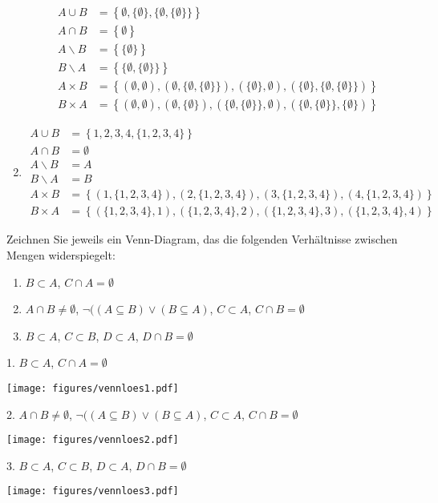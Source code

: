 \documentclass[12pt]{exam}
\begin{document}
\begin{questions}
\begin{solution}
\begin{enumerate}
\begin{align*}
			A\cup B &=\left\{\emptyset,\{\emptyset\},\{\emptyset,\{\emptyset\}\}\right\}\\
			A\cap B &=\left\{\emptyset\right\}\\
			A\backslash B &=\left\{\{\emptyset\}\right\}\\
			B\backslash A &=\left\{\{\emptyset,\{\emptyset\}\}\right\}\\
			A\times B &=\left\{(\emptyset,\emptyset),(\emptyset,\{\emptyset,\{\emptyset\}\}),(\{\emptyset\},\emptyset),(\{\emptyset\},\{\emptyset,\{\emptyset\}\})\right\}\\
			B\times A &=\left\{(\emptyset,\emptyset),(\emptyset,\{\emptyset\}),(\{\emptyset,\{\emptyset\}\},\emptyset),(\{\emptyset,\{\emptyset\}\},\{\emptyset\})\right\}
		\end{align*}
		\item \begin{align*}
			A\cup B &=\left\{1,2,3,4,\{1,2,3,4\}\right\}\\
			A\cap B &=\emptyset\\
			A\backslash B &=A\\
			B\backslash A &=B\\
			A\times B &=\left\{(1,\{1,2,3,4\}),(2,\{1,2,3,4\}),(3,\{1,2,3,4\}),(4,\{1,2,3,4\})\right\}\\
			B\times A &=\left\{(\{1,2,3,4\},1),(\{1,2,3,4\},2),(\{1,2,3,4\},3),(\{1,2,3,4\},4)\right\}
		\end{align*}
	\end{enumerate}
\end{solution}




Zeichnen Sie jeweils ein Venn-Diagram, das die folgenden Verhältnisse zwischen Mengen widerspiegelt:
\begin{enumerate}
	\item $B\subset A$, $C\cap A=\emptyset$
	\item $A\cap B\not=\emptyset$, $\neg((A\subseteq B)\vee (B\subseteq A)$, $C\subset A$, $C\cap B=\emptyset$
	\item $B\subset A$, $C\subset B$, $D\subset A$, $D\cap B=\emptyset$
\end{enumerate}
\begin{solution}
	1. $B\subset A$, $C\cap A=\emptyset$
	\begin{center}
		\texttt{[image: figures/vennloes1.pdf]}
	\end{center}
	2. $A\cap B\not=\emptyset$, $\neg((A\subseteq B)\vee (B\subseteq A)$, $C\subset A$, $C\cap B=\emptyset$
	\begin{center}
		\texttt{[image: figures/vennloes2.pdf]}
	\end{center}
	3. $B\subset A$, $C\subset B$, $D\subset A$, $D\cap B=\emptyset$
	\begin{center}
		\texttt{[image: figures/vennloes3.pdf]}
	\end{center}
\end{solution}




\end{questions}
\end{document}
